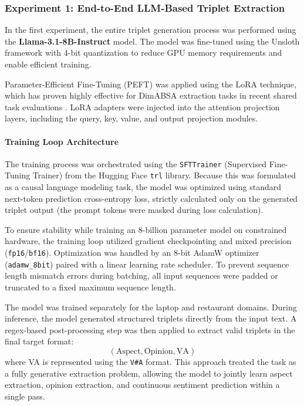 \documentclass{article}
\begin{document}
\subsubsection{Experiment 1: End-to-End LLM-Based Triplet Extraction}

In the first experiment, the entire triplet generation process was performed using the \textbf{Llama-3.1-8B-Instruct} model. The model was fine-tuned using the Unsloth framework with 4-bit quantization to reduce GPU memory requirements and enable efficient training.

Parameter-Efficient Fine-Tuning (PEFT) was applied using the LoRA technique, which has proven highly effective for DimABSA extraction tasks in recent shared task evaluations \cite{chen2026pali}. LoRA adapters were injected into the attention projection layers, including the query, key, value, and output projection modules. 

\paragraph{Training Loop Architecture}
The training process was orchestrated using the \texttt{SFTTrainer} (Supervised Fine-Tuning Trainer) from the Hugging Face \texttt{trl} library. Because this was formulated as a causal language modeling task, the model was optimized using standard next-token prediction cross-entropy loss, strictly calculated only on the generated triplet output (the prompt tokens were masked during loss calculation). 

To ensure stability while training an 8-billion parameter model on constrained hardware, the training loop utilized gradient checkpointing and mixed precision (\texttt{fp16}/\texttt{bf16}). Optimization was handled by an 8-bit AdamW optimizer (\texttt{adamw\_8bit}) paired with a linear learning rate scheduler. To prevent sequence length mismatch errors during batching, all input sequences were padded or truncated to a fixed maximum sequence length. 

The model was trained separately for the laptop and restaurant domains. During inference, the model generated structured triplets directly from the input text. A regex-based post-processing step was then applied to extract valid triplets in the final target format:
\begin{equation}
(\text{Aspect}, \text{Opinion}, \text{VA})
\end{equation}
where VA is represented using the \texttt{V\#A} format. This approach treated the task as a fully generative extraction problem, allowing the model to jointly learn aspect extraction, opinion extraction, and continuous sentiment prediction within a single pass.
\end{document}
